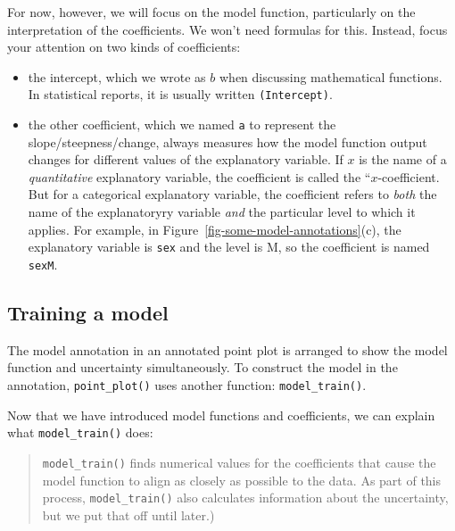 \documentclass[
  letterpaper,
  DIV=11,
  numbers=noendperiod,
  oneside]{scrartcl}
\begin{document}
For now, however, we will focus on the model function, particularly on
the interpretation of the coefficients. We won't need formulas for this.
Instead, focus your attention on two kinds of coefficients:

\begin{itemize}
\item
  the intercept, which we wrote as \(b\) when discussing mathematical
  functions. In statistical reports, it is usually written
  \texttt{(Intercept)}.
\item
  the other coefficient, which we named \texttt{a} to represent the
  slope/steepness/change, always measures how the model function output
  changes for different values of the explanatory variable. If \(x\) is
  the name of a \emph{quantitative} explanatory variable, the
  coefficient is called the ``\(x\)-coefficient. But for a categorical
  explanatory variable, the coefficient refers to \emph{both} the name
  of the explanatoryry variable \emph{and} the particular level to which
  it applies. For example, in
  Figure~\ref{fig-some-model-annotations}(c), the explanatory variable
  is \texttt{sex} and the level is M, so the coefficient is named
  \texttt{sexM}.
\end{itemize}

\subsection{Training a model}\label{training-a-model}

The model annotation in an annotated point plot is arranged to show the
model function and uncertainty simultaneously. To construct the model in
the annotation, \texttt{point\_plot()} uses another function:
\texttt{model\_train()}. {}

Now that we have introduced model functions and coefficients, we can
explain what \texttt{model\_train()} does:

\begin{quote}
\texttt{model\_train()} finds numerical values for the coefficients that
cause the model function to align as closely as possible to the data. As
part of this process, \texttt{model\_train()} also calculates
information about the uncertainty, but we put that off until later.)
\end{quote}
\end{document}
